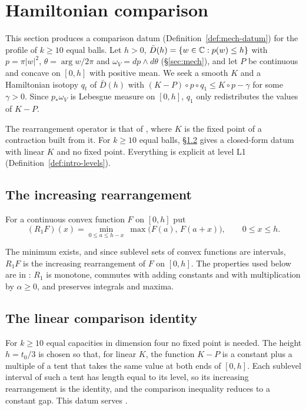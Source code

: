 \section{Hamiltonian comparison}\label{sec:cmp}

This section produces a comparison datum (Definition~\ref{def:mech-datum}) for the profile of $k\ge10$ equal balls.
Let $h>0$, $\bar D(h)=\{w\in\mathbb{C}:p(w)\le h\}$ with $p=\pi|w|^2$, $\theta=\arg w/2\pi$ and $\omega_V=dp\wedge d\theta$
(\S\ref{sec:mech}), and let $P$ be continuous and concave on $[0,h]$ with positive mean. We seek a smooth $K$ and a
Hamiltonian isotopy $q_t$ of $\bar D(h)$ with $(K-P)\circ p\circ q_1\le K\circ p-\gamma$ for some $\gamma>0$. Since
$p_*\omega_V$ is Lebesgue measure on $[0,h]$, $q_1$ only redistributes the values of $K-P$.

The rearrangement operator is that of \cite[\S2]{OpenAI2026}, where $K$ is the fixed point of a contraction built
from it. For $k\ge10$ equal balls, \S\ref{sec:cmp-linear} gives a closed-form datum with linear $K$ and no fixed
point. Everything is explicit at level L1 (Definition~\ref{def:intro-levels}).

\subsection{The increasing rearrangement}\label{sec:cmp-rearrangement}

\begin{definition}\label{def:cmp-rearrangement}
For a continuous convex function $F$ on $[0,h]$ put
\[
 (R_1F)(x)=\min_{0\le a\le h-x}\ \max\bigl(F(a),\,F(a+x)\bigr),\qquad 0\le x\le h .
\]
\end{definition}

The minimum exists, and since sublevel sets of convex functions are intervals, $R_1F$ is the increasing rearrangement
of $F$ on $[0,h]$. The properties used below are in
: $R_1$ is monotone, commutes with adding constants and with multiplication by
$\alpha\ge0$, and preserves integrals and maxima.

\subsection{The linear comparison identity}\label{sec:cmp-linear}

For $k\ge10$ equal capacities in dimension four no fixed point is needed. The height $h=t_0/3$ is chosen so that,
for linear $K$, the function $K-P$ is a constant plus a multiple of a tent that takes the same value at both ends of
$[0,h]$. Each sublevel interval of such a tent has length equal to its level, so its increasing rearrangement is the
identity, and the comparison inequality reduces to a constant gap. This datum serves .

